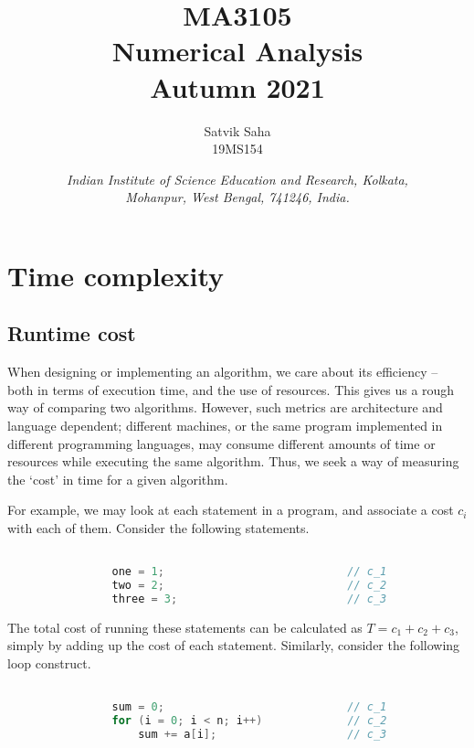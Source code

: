 \documentclass[11pt]{article}
\title{
    \Large\textsc{MA3105} \\
    \Huge \textbf{Numerical Analysis} \\
    \vspace{5pt}
    \Large{Autumn 2021}
}
\author{
    \large Satvik Saha
    \\\textsc{\small 19MS154}
}
\date{\normalsize
    \textit{Indian Institute of Science Education and Research, Kolkata, \\
    Mohanpur, West Bengal, 741246, India.} \\
}
\theoremstyle{definition}
\theoremstyle{remark}
\numberwithin{equation}{section}
\begin{document}
    \maketitle

    \tableofcontents

    \section{Time complexity}

    \subsection{Runtime cost}
    When designing or implementing an algorithm, we care about its efficiency -- both
    in terms of execution time, and the use of resources. This gives us a rough way
    of comparing two algorithms. However, such metrics are architecture and language
    dependent; different machines, or the same program implemented in different
    programming languages, may consume different amounts of time or resources while
    executing the same algorithm. Thus, we seek a way of measuring the `cost' in time
    for a given algorithm.

    For example, we may look at each statement in a program, and associate a cost
    $c_i$ with each of them. Consider the following statements.

    \begin{minipage}{\linewidth}  
    \begin{lstlisting}[language=C, numbers=none]

                one = 1;                            // c_1
                two = 2;                            // c_2
                three = 3;                          // c_3
    \end{lstlisting}
    \end{minipage}

    The total cost of running these statements can be calculated as $T = c_1 + c_2 +
    c_3$, simply by adding up the cost of each statement. Similarly, consider the
    following loop construct.

    \begin{minipage}{\linewidth}  
    \begin{lstlisting}[language=C, numbers=none]

                sum = 0;                            // c_1
                for (i = 0; i < n; i++)             // c_2
                    sum += a[i];                    // c_3
    \end{lstlisting}
    \end{minipage}
\end{document}
